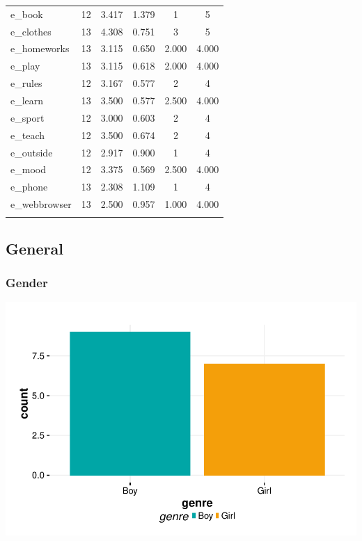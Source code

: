 \documentclass{article}
\begin{document}
\begin{table}[!htbp]
\begin{tabular}{@{\extracolsep{5pt}}lccccc}
e\_book & 12 & 3.417 & 1.379 & 1 & 5 \\ 
e\_clothes & 13 & 4.308 & 0.751 & 3 & 5 \\ 
e\_homeworks & 13 & 3.115 & 0.650 & 2.000 & 4.000 \\ 
e\_play & 13 & 3.115 & 0.618 & 2.000 & 4.000 \\ 
e\_rules & 12 & 3.167 & 0.577 & 2 & 4 \\ 
e\_learn & 13 & 3.500 & 0.577 & 2.500 & 4.000 \\ 
e\_sport & 12 & 3.000 & 0.603 & 2 & 4 \\ 
e\_teach & 12 & 3.500 & 0.674 & 2 & 4 \\ 
e\_outside & 12 & 2.917 & 0.900 & 1 & 4 \\ 
e\_mood & 12 & 3.375 & 0.569 & 2.500 & 4.000 \\ 
e\_phone & 13 & 2.308 & 1.109 & 1 & 4 \\ 
e\_webbrowser & 13 & 2.500 & 0.957 & 1.000 & 4.000 \\ 
\hline \\[-1.8ex] 
\end{tabular} 
\end{table} 
\subsection{General}

\subsubsection{Gender}
\includegraphics{interviews/interviews-plot_gender}
\end{document}
